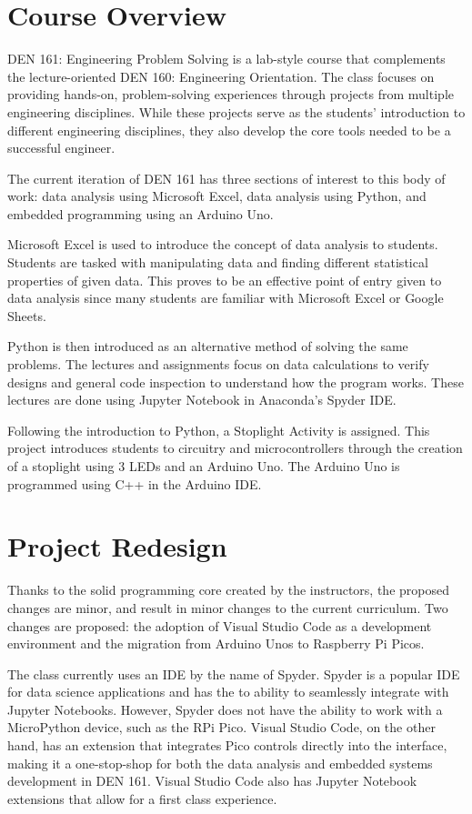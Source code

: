 \section{Course Overview}

DEN 161: Engineering Problem Solving is a lab-style course that complements the lecture-oriented DEN 160: 
Engineering Orientation. The class focuses on providing hands-on, problem-solving experiences through projects 
from multiple engineering disciplines. While these projects serve as the students' introduction to different 
engineering disciplines, they also develop the core tools needed to be a successful engineer. 

The current iteration of DEN 161 has three sections of interest to this body of work: data analysis using 
Microsoft Excel, data analysis using Python, and embedded programming using an Arduino Uno.

Microsoft Excel is used to introduce the concept of data analysis to students. Students are tasked with 
manipulating data and finding different statistical properties of given data. This proves to be an effective 
point of entry given to data analysis since many students are familiar with Microsoft Excel or Google Sheets.

Python is then introduced as an alternative method of solving the same problems. The lectures and assignments 
focus on data calculations to verify designs and general code inspection to understand how the program works. 
These lectures are done using Jupyter Notebook in Anaconda's Spyder IDE. 

Following the introduction to Python, a Stoplight Activity is assigned. This project introduces students to 
circuitry and microcontrollers through the creation of a stoplight using 3 LEDs and an Arduino Uno. The Arduino 
Uno is programmed using C++ in the Arduino IDE.

\section{Project Redesign}

Thanks to the solid programming core created by the instructors, the proposed changes are minor, and result in 
minor changes to the current curriculum. Two changes are proposed: the adoption of Visual Studio Code as a 
development environment and the migration from Arduino Unos to Raspberry Pi Picos. 

The class currently uses an IDE by the name of Spyder. Spyder is a popular IDE for data science applications and 
has the to ability to seamlessly integrate with Jupyter Notebooks. However, Spyder does not have the ability to work 
with a MicroPython device, such as the RPi Pico. Visual Studio Code, on the other hand, has an extension that 
integrates Pico controls directly into the interface, making it a one-stop-shop for both the data analysis and 
embedded systems development in DEN 161. Visual Studio Code also has Jupyter Notebook extensions that allow for 
a first class experience.

